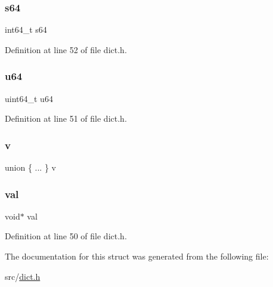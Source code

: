\subsubsection{\texorpdfstring{s64}{s64}}
{\footnotesize\ttfamily int64\+\_\+t s64}



Definition at line 52 of file dict.\+h.

\mbox{\label{structdict_entry_a91ee3b6e2425e78feef03fb5c69d63e5}} 
\subsubsection{\texorpdfstring{u64}{u64}}
{\footnotesize\ttfamily uint64\+\_\+t u64}



Definition at line 51 of file dict.\+h.

\mbox{\label{structdict_entry_a365d8ec140a4da1dd6163174c1476783}} 
\subsubsection{\texorpdfstring{v}{v}}
{\footnotesize\ttfamily union \{ ... \}   v}

\mbox{\label{structdict_entry_ab03f36f103bdec81305fd301f1f93885}} 
\subsubsection{\texorpdfstring{val}{val}}
{\footnotesize\ttfamily void$\ast$ val}



Definition at line 50 of file dict.\+h.



The documentation for this struct was generated from the following file\+:\begin{DoxyCompactItemize}
\item 
src/\hyperlink{dict_8h}{dict.\+h}\end{DoxyCompactItemize}
